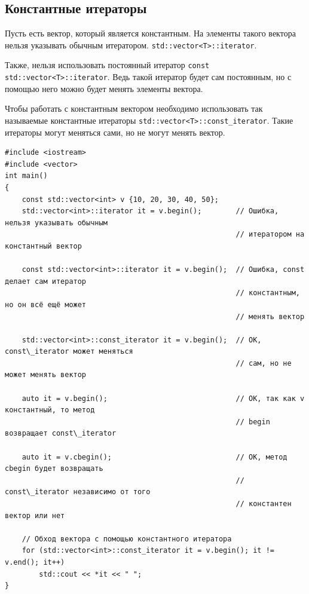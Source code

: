 \documentclass{article}
\begin{document}
\subsection*{Константные итераторы}
Пусть есть вектор, который является константным. На элементы такого вектора нельзя указывать обычным итератором. \texttt{std::vector<T>::iterator}. 

Также, нельзя использовать постоянный итератор \texttt{const std::vector<T>::iterator}. Ведь такой итератор будет сам постоянным, но с помощью него можно будет менять элементы вектора.

Чтобы работать с константным вектором необходимо использовать так называемые константные итераторы \texttt{std::vector<T>::const\_iterator}. Такие итераторы могут меняться сами, но не могут менять вектор.
\begin{lstlisting}
#include <iostream>
#include <vector>
int main() 
{
    const std::vector<int> v {10, 20, 30, 40, 50};
    std::vector<int>::iterator it = v.begin();        // Ошибка, нельзя указывать обычным 
                                                      // итератором на константный вектор
                                                      
    const std::vector<int>::iterator it = v.begin();  // Ошибка, const делает сам итератор 
                                                      // константным, но он всё ещё может 
                                                      // менять вектор
                                                      
    std::vector<int>::const_iterator it = v.begin();  // ОК, const\_iterator может меняться
    											      // сам, но не может менять вектор
    											      
    auto it = v.begin();                              // ОК, так как v константный, то метод
                                                      // begin возвращает const\_iterator
                                                      
    auto it = v.cbegin();                             // ОК, метод cbegin будет возвращать
                                                      // const\_iterator независимо от того
                                                      // константен вектор или нет
                                                      
    // Обход вектора с помощью константного итератора
    for (std::vector<int>::const_iterator it = v.begin(); it != v.end(); it++)
        std::cout << *it << " ";
}
\end{lstlisting}
\end{document}
